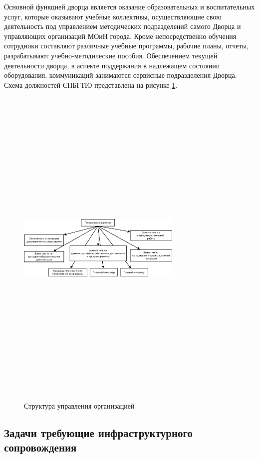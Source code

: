 \documentclass[utf8,usehyperref,12pt]{G7-32}
\begin{document}
Основной функцией дворца является оказание образовательных и воспитательных услуг, которые оказывают учебные коллективы, осуществляющие свою деятельность под управлением методических подразделений самого Дворца
и управляющих организаций МОиН города. Кроме непосредственно обучения сотрудники  составляют различные учебные программы, рабочие планы, отчеты, разрабатывают учебно-методические пособия.
Обеспечением текущей деятельности дворца, в аспекте поддержания в надлежащем состоянии оборудования, коммуникаций занимаются сервисные подразделения Дворца. Схема должностей СПБГТЮ представлена на рисунке \ref{fig:fig_management_struct}.

\begin{figure}[ht]
   \centering%
   \includegraphics[height=160mm, width=0.7\textwidth, clip, keepaspectratio]{pictures/management_structure}
   \caption{Структура управления организацией}\label{fig:fig_management_struct}
 \end{figure}

\subsection{Задачи требующие инфраструктурного сопровождения}\label{ssect:tasks_infra}
\end{document}
